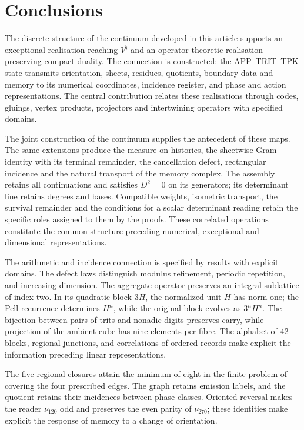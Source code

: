 \section{Conclusions}
\label{iv:conclusiones}
\begingroup
\setlength{\baselineskip}{12pt}
\setlength{\parskip}{0pt}
\setlength{\abovedisplayskip}{5pt}
\setlength{\belowdisplayskip}{5pt}

The discrete structure of the continuum developed in this article
supports an exceptional realisation reaching \(V^\natural\) and
an operator-theoretic realisation preserving compact duality.
The connection is constructed: the APP--TRIT--TPK state transmits
orientation, sheets, residues, quotients, boundary data and memory
to its numerical coordinates, incidence register, and phase and action
representations. The central contribution relates these realisations
through codes, gluings, vertex products, projectors and intertwining
operators with specified domains.

The joint construction of the continuum supplies the antecedent of
these maps. The same extensions produce the measure on histories,
the sheetwise Gram identity with its terminal remainder, the cancellation
defect, rectangular incidence and the natural transport of the memory
complex. The assembly retains all continuations and satisfies \(D^2=0\)
on its generators; its determinant line retains degrees and bases.
Compatible weights, isometric transport, the survival remainder and
the conditions for a scalar determinant reading retain the specific
roles assigned to them by the proofs. These correlated operations
constitute the common structure preceding numerical, exceptional
and dimensional representations.

The arithmetic and incidence connection is specified by results with
explicit domains. The defect laws distinguish modulus refinement,
periodic repetition, and increasing dimension. The aggregate operator
preserves an integral sublattice of index two. In its quadratic block
\(3H\), the normalized unit \(H\) has norm one; the Pell recurrence
determines \(H^n\), while the original block evolves as \(3^nH^n\).
The bijection between pairs
of trits and nonadic digits preserves carry, while projection of the
ambient cube has nine elements per fibre. The alphabet of \(42\) blocks,
regional junctions, and correlations of ordered records make explicit
the information preceding linear representations.

The five regional closures attain the minimum of eight in the finite
problem of covering the four prescribed edges. The graph retains
emission labels, and the quotient retains their incidences between
phase classes. Oriented reversal makes the reader \(\nu_{120}\) odd
and preserves the even parity of \(\nu_{270}\); these identities
make explicit the response of memory to a change of orientation.

